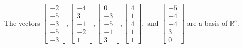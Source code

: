 \begin{exercise}
\begin{exerciseStatement}
  \end{exerciseStatement}
  \begin{exerciseAnswer}
   The vectors \(\left[\begin{array}{r}
-2 \\
-5 \\
-3 \\
-5 \\
-3
\end{array}\right] , \left[\begin{array}{r}
-4 \\
3 \\
-1 \\
-2 \\
1
\end{array}\right] , \left[\begin{array}{r}
0 \\
-3 \\
-5 \\
-1 \\
3
\end{array}\right] , \left[\begin{array}{r}
4 \\
1 \\
4 \\
1 \\
1
\end{array}\right] , \text{ and } \left[\begin{array}{r}
-5 \\
-4 \\
-4 \\
3 \\
0
\end{array}\right]\) 
  	 are  a basis of \(\mathbb{R}^5\).
  


  \end{exerciseAnswer}
\end{exercise}